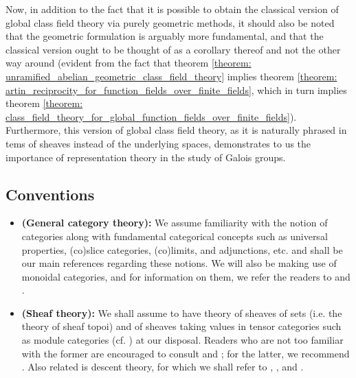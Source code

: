        Now, in addition to the fact that it is possible to obtain the classical version of global class field theory via purely geometric methods, it should also be noted that the geometric formulation is arguably more fundamental, and that the classical version ought to be thought of as a corollary thereof and not the other way around (evident from the fact that theorem \ref{theorem: unramified_abelian_geometric_class_field_theory} implies theorem \ref{theorem: artin_reciprocity_for_function_fields_over_finite_fields}, which in turn implies theorem \ref{theorem: class_field_theory_for_global_function_fields_over_finite_fields}). Furthermore, this version of global class field theory, as it is naturally phrased in tems of sheaves instead of the underlying spaces, demonstrates to us the importance of representation theory in the study of Galois groups.
        
    \subsection{Conventions}
        \begin{convention} \label{conv: category_theory}
            \noindent
            \begin{itemize}
                \item \textbf{(General category theory):} We assume familiarity with the notion of categories along with fundamental categorical concepts such as universal properties, (co)slice categories, (co)limits, and adjunctions, etc. \cite{maclane} and \cite[\href{https://stacks.math.columbia.edu/tag/0011}{Tag 0011}]{stacks} shall be our main references regarding these notions. We will also be making use of monoidal categories, and for information on them, we refer the readers to \cite[Chapter VII]{maclane} and \cite[Chapters 2 and 4]{EGNO}.
                \item \textbf{(Sheaf theory):} We shall assume to have theory of sheaves of sets (i.e. the theory of sheaf topoi) and of sheaves taking values in tensor categories such as module categories (cf. \cite[Chapter 4]{EGNO}) at our disposal. Readers who are not too familiar with the former are encouraged to consult \cite{sga4} and \cite[\href{https://stacks.math.columbia.edu/tag/00UZ}{Tag 00UZ}]{stacks}; for the latter, we recommend \cite[\href{https://stacks.math.columbia.edu/tag/006A}{Tag 006A}, \href{https://stacks.math.columbia.edu/tag/01AC}{Tag 01AC}, and \href{https://stacks.math.columbia.edu/tag/03A4}{Tag 03A4}]{stacks}. Also related is descent theory, for which we shall refer to \cite{vistoli_descent}, \cite[\href{https://stacks.math.columbia.edu/tag/0266}{Tag 0266}]{stacks}, and \cite[\href{https://stacks.math.columbia.edu/tag/0238}{Tag 0238}]{stacks}.
            \end{itemize}
        \end{convention}
        
